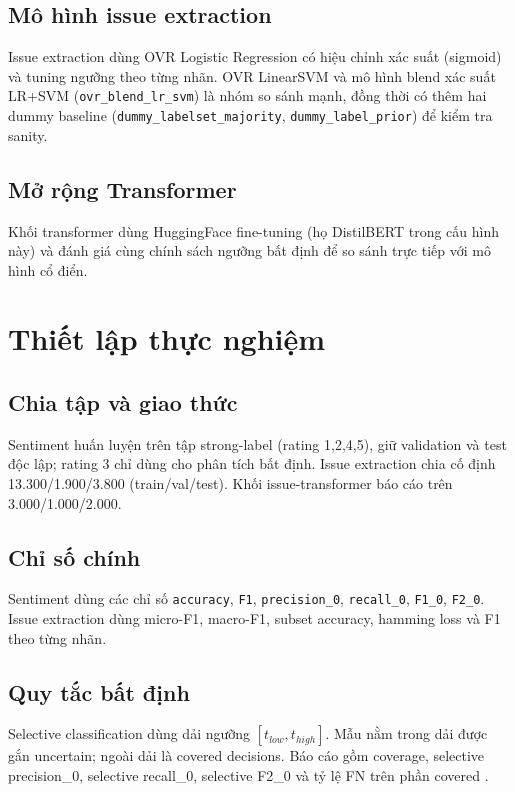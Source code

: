 ﻿\documentclass[12pt,a4paper]{article}
\begin{document}
\subsection{Mô hình issue extraction}
Issue extraction dùng OVR Logistic Regression có hiệu chỉnh xác suất (sigmoid) và tuning ngưỡng theo từng nhãn. OVR LinearSVM và mô hình blend xác suất LR+SVM (\texttt{ovr\_blend\_lr\_svm}) là nhóm so sánh mạnh, đồng thời có thêm hai dummy baseline (\texttt{dummy\_labelset\_majority}, \texttt{dummy\_label\_prior}) để kiểm tra sanity.

\subsection{Mở rộng Transformer}
Khối transformer dùng HuggingFace fine-tuning (họ DistilBERT trong cấu hình này) và đánh giá cùng chính sách ngưỡng bất định để so sánh trực tiếp với mô hình cổ điển.

\section{Thiết lập thực nghiệm}
\subsection{Chia tập và giao thức}
Sentiment huấn luyện trên tập strong-label (rating 1,2,4,5), giữ validation và test độc lập; rating 3 chỉ dùng cho phân tích bất định. Issue extraction chia cố định 13.300/1.900/3.800 (train/val/test). Khối issue-transformer báo cáo trên 3.000/1.000/2.000.

\subsection{Chỉ số chính}
Sentiment dùng các chỉ số \texttt{accuracy}, \texttt{F1}, \texttt{precision\_0}, \texttt{recall\_0}, \texttt{F1\_0}, \texttt{F2\_0}. Issue extraction dùng micro-F1, macro-F1, subset accuracy, hamming loss và F1 theo từng nhãn.

\subsection{Quy tắc bất định}
Selective classification dùng dải ngưỡng \([t_{low}, t_{high}]\). Mẫu nằm trong dải được gắn uncertain; ngoài dải là covered decisions. Báo cáo gồm coverage, selective precision\_0, selective recall\_0, selective F2\_0 và tỷ lệ FN trên phần covered \cite{geifman2017}.
\end{document}
